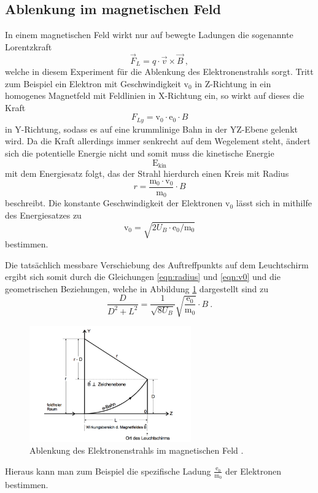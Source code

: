 \subsection{Ablenkung im magnetischen Feld}
In einem magnetischen Feld wirkt nur auf bewegte Ladungen die sogenannte
Lorentzkraft
\begin{equation}
  \vec{F}_L = q \cdot \vec{v} \times \vec{B} \: ,
  \label{eqn:lorentz}
\end{equation}
welche in diesem Experiment für die Ablenkung des Elektronenstrahls sorgt.
Tritt zum Beispiel ein Elektron mit Geschwindigkeit $\text{v}_0$ in Z-Richtung in ein homogenes
Magnetfeld mit Feldlinien in X-Richtung ein, so wirkt auf dieses die Kraft
\begin{equation}
  F_{Ly} = \text{v}_0 \cdot \text{e}_0 \cdot B
\end{equation}
in Y-Richtung, sodass es auf eine krummlinige Bahn in der YZ-Ebene gelenkt wird.
Da die Kraft allerdings immer senkrecht auf dem Wegelement steht, ändert sich die
potentielle Energie nicht und somit muss die kinetische Energie
\begin{equation}
  \text{E}_{\text{kin}}
\end{equation}
mit dem Energiesatz folgt, das der Strahl hierdurch einen Kreis mit Radius
\begin{equation}
  r = \frac{\text{m}_0 \cdot \text{v}_0}{\text{m}_0} \cdot B
  \label{eqn:radius}
\end{equation}
beschreibt.
Die konstante Geschwindigkeit der Elektronen $\text{v}_0$ lässt sich in mithilfe
des Energiesatzes zu
\begin{equation}
  \text{v}_0 = \sqrt{2 U_B \cdot \text{e}_0 / \text{m}_0}
  \label{eqn:v0}
\end{equation}
bestimmen.

Die tatsächlich messbare Verschiebung des Auftreffpunkts auf dem Leuchtschirm
ergibt sich somit durch die Gleichungen \ref{eqn:radius} und \ref{eqn:v0} und die
geometrischen Beziehungen, welche in Abbildung \ref{fig:magnet} dargestellt sind zu
\begin{equation}
   \frac{D}{D^2 + L^2} = \frac{1}{\sqrt{8 U_B}}\sqrt{\frac{\text{e}_0}{\text{m}_0}}\cdot B \: .
   \label{eqn:magnet}
\end{equation}

\begin{figure}[H]
  \centering
  \includegraphics[height=5cm]{Magnet.png}
  \caption{Ablenkung des Elektronenstrahls im magnetischen Feld \cite{skript2}.}
  \label{fig:magnet}
\end{figure}
Hieraus kann man zum Beispiel die spezifische Ladung $ \frac{{\text{e}_0}}{{\text{m}_0}} $
der Elektronen bestimmen.
